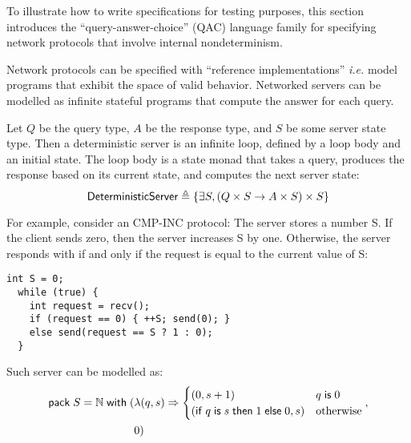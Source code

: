 To illustrate how to write specifications for testing purposes, this section
introduces the ``query-answer-choice'' (QAC) language family for specifying
network protocols that involve internal nondeterminism.

\begin{definition}
Network protocols can be specified with ``reference implementations'' {\it i.e.}
model programs that exhibit the space of valid behavior.  Networked servers can
be modelled as infinite stateful programs that compute the answer for each
query.

Let $Q$ be the query type, $A$ be the response type, and $S$ be some server
state type.  Then a deterministic server is an infinite loop, defined by a loop
body and an initial state.  The loop body is a state monad that takes a query,
produces the response based on its current state, and computes the next server
state:
\[ \mathsf{DeterministicServer}\triangleq\{\exists S,(Q \times S \to A \times S) \times S\} \]
\end{definition}

For example, consider an CMP-INC protocol: The server stores a number \inlinec S.
If the client sends zero, then the server increases \inlinec S by one.
Otherwise, the server responds with  if and only if the request is
equal to the current value of \inlinec S:
\begin{lstlisting}[style=customc]
  int S = 0;
  while (true) {
    int request = recv();
    if (request == 0) { ++S; send(0); }
    else send(request == S ? 1 : 0);
  }
\end{lstlisting}

Such server can be modelled as:
\begin{align*}
  \mathsf{pack}\;S=\mathbb N\;\mathsf{with}\;(&\lambda(q,s)\Rightarrow\begin{cases}
        (0,s+1)&q\;\mathsf{is}\;0\\
        (\mathsf{if}\; q\;\mathsf{is}\; s\;\mathsf{then}\;1\;\mathsf{else}\;0,s)&\mathrm{otherwise}
    \end{cases},\\
    &0)
\end{align*}

